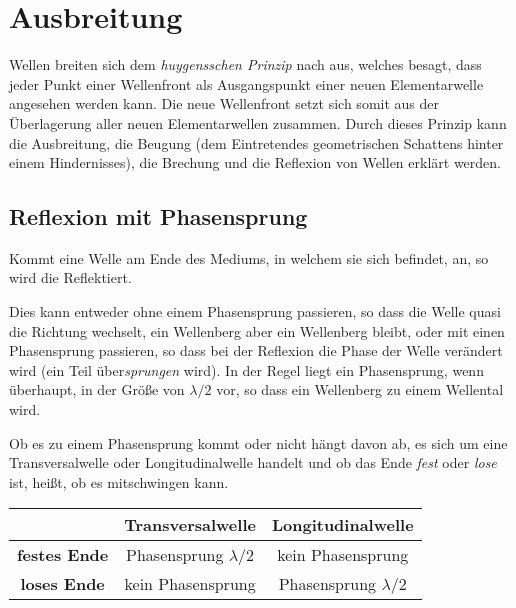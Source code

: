 \documentclass{article}
\begin{document}
\section{Ausbreitung} 
Wellen breiten sich dem \emph{huygensschen Prinzip} nach aus, welches besagt, dass jeder Punkt einer Wellenfront als Ausgangspunkt einer neuen Elementarwelle angesehen werden kann. Die neue Wellenfront setzt sich somit aus der Überlagerung aller neuen Elementarwellen zusammen. \newline
Durch dieses Prinzip kann die Ausbreitung, die Beugung (dem Eintretendes geometrischen Schattens hinter einem Hindernisses), die Brechung und die Reflexion von Wellen erklärt werden. 
 
\subsection{Reflexion mit Phasensprung}
Kommt eine Welle am Ende des Mediums, in welchem sie sich befindet, an, so wird die Reflektiert.
 
Dies kann entweder ohne einem Phasensprung passieren, so dass die Welle quasi die Richtung wechselt, ein Wellenberg aber ein Wellenberg bleibt, oder mit einen Phasensprung passieren, so dass bei der Reflexion die Phase der Welle verändert wird (ein Teil über\emph{sprungen} wird). In der Regel liegt ein Phasensprung, wenn überhaupt, in der Größe von $\lambda / 2$ vor, so dass ein Wellenberg zu einem Wellental wird.
 
Ob es zu einem Phasensprung kommt oder nicht hängt davon ab, es sich um eine Transversalwelle oder Longitudinalwelle handelt und ob das Ende \emph{fest} oder \emph{lose} ist, heißt, ob es mitschwingen kann.
 
\begin{center}
\begin{tabular}{ |c|c|c| }
\hline
   & \textbf{Transversalwelle} & \textbf{Longitudinalwelle} \\
\hline
 \textbf{festes Ende} & Phasensprung $\lambda / 2$ & kein Phasensprung \\
\hline
 \textbf{loses Ende} & kein Phasensprung & Phasensprung $\lambda / 2$ \\
\hline
\end{tabular}
\end{center}
 
\end{document}
